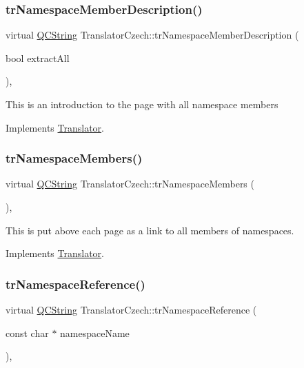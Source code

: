 \subsubsection{\texorpdfstring{trNamespaceMemberDescription()}{trNamespaceMemberDescription()}}
{\footnotesize\ttfamily virtual \mbox{\hyperlink{class_q_c_string}{Q\+C\+String}} Translator\+Czech\+::tr\+Namespace\+Member\+Description (\begin{DoxyParamCaption}\item[{bool}]{extract\+All }\end{DoxyParamCaption})\hspace{0.3cm}{\ttfamily [inline]}, {\ttfamily [virtual]}}

This is an introduction to the page with all namespace members 

Implements \mbox{\hyperlink{class_translator}{Translator}}.

\mbox{\label{class_translator_czech_a4457071701f72bcb850102e53cd64c75}} 
\subsubsection{\texorpdfstring{trNamespaceMembers()}{trNamespaceMembers()}}
{\footnotesize\ttfamily virtual \mbox{\hyperlink{class_q_c_string}{Q\+C\+String}} Translator\+Czech\+::tr\+Namespace\+Members (\begin{DoxyParamCaption}{ }\end{DoxyParamCaption})\hspace{0.3cm}{\ttfamily [inline]}, {\ttfamily [virtual]}}

This is put above each page as a link to all members of namespaces. 

Implements \mbox{\hyperlink{class_translator}{Translator}}.

\mbox{\label{class_translator_czech_a90101f15663ae5bfb1600402ed8c5547}} 
\subsubsection{\texorpdfstring{trNamespaceReference()}{trNamespaceReference()}}
{\footnotesize\ttfamily virtual \mbox{\hyperlink{class_q_c_string}{Q\+C\+String}} Translator\+Czech\+::tr\+Namespace\+Reference (\begin{DoxyParamCaption}\item[{const char $\ast$}]{namespace\+Name }\end{DoxyParamCaption})\hspace{0.3cm}{\ttfamily [inline]}, {\ttfamily [virtual]}}

